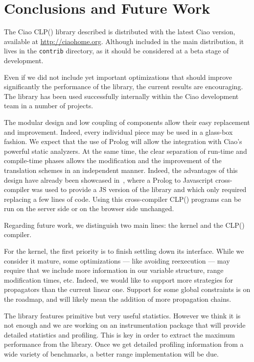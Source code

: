 \documentclass{llncs}
\newcommand{\clpfd}{CLP()\xspace}
\newcommand{\fd}{\xspace}
\begin{document}
\section{Conclusions and Future Work}
\label{sec:conclusions}

The Ciao \clpfd library described is distributed with the latest Ciao
version, available at \url{http://ciaohome.org}. Although included in
the main distribution, it lives in the \verb!contrib! directory, as it
should be considered at a beta stage of development.

Even if we did not include yet important optimizations that should
improve significantly the performance of the library, the current
results are encouraging. The library has been used successfully 
internally within the Ciao development team in a number of projects.

The modular design and low coupling of components allow their easy
replacement and improvement. Indeed, every individual piece may be
used in a glass-box fashion. We expect that the use of Prolog will
allow the integration with Ciao's powerful static analyzers. At the
same time, the clear separation of run-time and compile-time phases
allows the modification and the improvement of the translation schemes
in an independent manner.  Indeed, the advantages of this design have
already been showcased in~\cite{clp-to-js-iclp12}, where a Prolog to
Javascript cross-compiler was used to provide a JS version of the
library and which only required replacing a few lines of code.  Using
this cross-compiler \clpfd programs can be run on the server side or
on the browser side unchanged.

Regarding future work, we distinguish two main lines: the kernel and
the \clpfd compiler.

For the kernel, the first priority is to finish settling down its
interface. While we consider it mature, some optimizations --- like
avoiding reexecution --- may require that we include more information
in our \fd variable structure, range modification times, etc.  Indeed,
we would like to support more strategies for propagators than the
current linear one. Support for some global constraints is on the
roadmap, and will likely mean the addition of more propagation chains.

The library features primitive but very useful statistics. However we
think it is not enough and we are working on an \fd instrumentation
package that will provide detailed statistics and profiling. This is
key in order to extract the maximum performance from the library.
Once we get detailed profiling information from a wide variety of
benchmarks, a better range implementation will be due.
\end{document}
